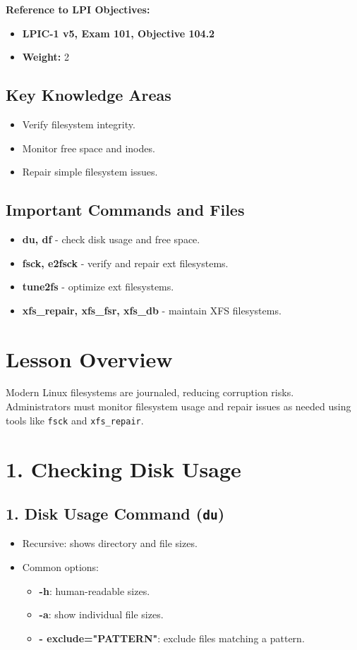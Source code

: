 \documentclass[a4paper]{report}
\begin{document}
\textbf{Reference to LPI Objectives:}
\begin{itemize}
    \item \textbf{LPIC-1 v5, Exam 101, Objective 104.2}
    \item \textbf{Weight:} 2
\end{itemize}

\subsection*{Key Knowledge Areas}
\begin{itemize}
    \item Verify filesystem integrity.
    \item Monitor free space and inodes.
    \item Repair simple filesystem issues.
\end{itemize}

\subsection*{Important Commands and Files}
\begin{itemize}
    \item \textbf{du, df} \text{-}- check disk usage and free space.
    \item \textbf{fsck, e2fsck} \text{-}- verify and repair ext filesystems.
    \item \textbf{tune2fs} \text{-}- optimize ext filesystems.
    \item \textbf{xfs\_repair, xfs\_fsr, xfs\_db} \text{-}- maintain XFS filesystems.
\end{itemize}

\section*{Lesson Overview}

Modern Linux filesystems are journaled, reducing corruption risks. Administrators must monitor filesystem usage and repair issues as needed using tools like \texttt{fsck} and \texttt{xfs\_repair}.

\section*{1. Checking Disk Usage}

\subsection*{1. Disk Usage Command (\texttt{du})}
\begin{itemize}
    \item Recursive: shows directory and file sizes.
    \item Common options:
    \begin{itemize}
        \item \textbf{-h}: human-readable sizes.
        \item \textbf{-a}: show individual file sizes.
        \item \textbf{\text{-}- exclude="PATTERN"}: exclude files matching a pattern.
    \end{itemize}
\end{itemize}
\end{document}

